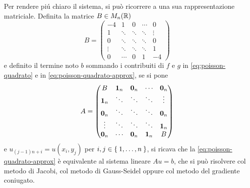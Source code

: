 	Per rendere piú chiaro il sistema, si può ricorrere a una sua rappresentazione matriciale. Definita la matrice \(B \in M_n (\mathbb{R})\)
	\begin{equation*}
		B =
		\begin{pmatrix}
			-4     & 1      & 0      & \cdots & 0      \\
			1      & \ddots & \ddots & \ddots & \vdots \\
			0      & \ddots & \ddots & \ddots & 0      \\
			\vdots & \ddots & \ddots & \ddots & 1      \\
			0      & \cdots & 0      & 1      & -4
		\end{pmatrix}
	\end{equation*}
	e definito il termine noto \(b\) sommando i contribuiti di \(f\) e \(g\) in \eqref{eq:poisson-quadrato} e in \eqref{eq:poisson-quadrato-approx}, se si pone
	\begin{equation*}
		A =
		\begin{pmatrix}
			B       & \mathbf{1}_n & \mathbf{0}_n & \cdots & \mathbf{0}_n \\
			\mathbf{1}_n  & \ddots & \ddots  & \ddots & \vdots  \\
			\mathbf{0}_n & \ddots & \ddots  & \ddots & \mathbf{0}_n \\
			\vdots  & \ddots & \ddots  & \ddots & \mathbf{1}_n  \\
			\mathbf{0}_n & \cdots & \mathbf{0}_n & \mathbf{1}_n & B
		\end{pmatrix}
	\end{equation*}
	e \(u_{(j - 1)n + i} = u (x_i, y_j)\) per \(i, j \in \Set{1, \dots, n}\), si ricava che la \eqref{eq:poisson-quadrato-approx} è equivalente al sistema lineare \(A u = b\), che si può risolvere col metodo di Jacobi, col metodo di Gauss-Seidel oppure col metodo del gradiente coniugato.
	
